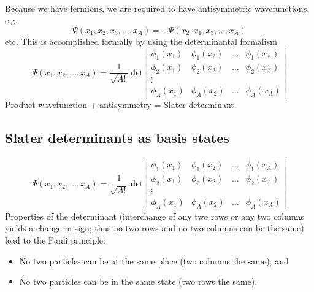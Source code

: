 \documentclass[%
oneside,                 %
final,                   %
10pt]{article}
\begin{document}
\paragraph{}
Because we have fermions, we are required to have antisymmetric wavefunctions, e.g.
\[
\Psi(x_1, x_2, x_3, \ldots, x_A) = - \Psi(x_2, x_1, x_3, \ldots, x_A)
\]
etc. This is accomplished formally by using the determinantal formalism
\[
\Psi(x_1, x_2, \ldots, x_A) 
= \frac{1}{\sqrt{A!}} 
\det \left | 
\begin{array}{cccc}
\phi_1(x_1) & \phi_1(x_2) & \ldots & \phi_1(x_A) \\
\phi_2(x_1) & \phi_2(x_2) & \ldots & \phi_2(x_A) \\
 \vdots & & &  \\
\phi_A(x_1) & \phi_A(x_2) & \ldots & \phi_A(x_A) 
\end{array}
\right |
\]
Product wavefunction + antisymmetry = Slater determinant.



\subsection*{Slater determinants as basis states}

\paragraph{}
\[
\Psi(x_1, x_2, \ldots, x_A) 
= \frac{1}{\sqrt{A!}} 
\det \left | 
\begin{array}{cccc}
\phi_1(x_1) & \phi_1(x_2) & \ldots & \phi_1(x_A) \\
\phi_2(x_1) & \phi_2(x_2) & \ldots & \phi_2(x_A) \\
 \vdots & & &  \\
\phi_A(x_1) & \phi_A(x_2) & \ldots & \phi_A(x_A) 
\end{array}
\right |
\]
Properties of the determinant (interchange of any two rows or 
any two columns yields a change in sign; thus no two rows and no 
two columns can be the same) lead to the Pauli principle:

\begin{itemize}
\item No two particles can be at the same place (two columns the same); and

\item No two particles can be in the same state (two rows the same).
\end{itemize}
\end{document}
